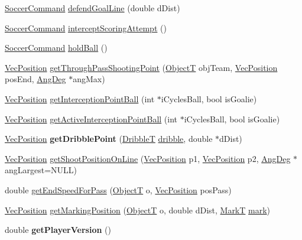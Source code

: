 \begin{DoxyCompactItemize}
\item 
\hyperlink{classSoccerCommand}{Soccer\+Command} \hyperlink{classBasicPlayer_ad6be860b141f47cb33eec9f0a3762dd8}{defend\+Goal\+Line} (double d\+Dist)
\item 
\hyperlink{classSoccerCommand}{Soccer\+Command} \hyperlink{classBasicPlayer_a20ea44e2d6f0105ae521c9ac9bf407ea}{intercept\+Scoring\+Attempt} ()
\item 
\hyperlink{classSoccerCommand}{Soccer\+Command} \hyperlink{classBasicPlayer_a6927be949526b68617b8663eae9e2b7d}{hold\+Ball} ()
\item 
\hyperlink{classVecPosition}{Vec\+Position} \hyperlink{classBasicPlayer_a803fc819ba92d02bf244d883f0f76203}{get\+Through\+Pass\+Shooting\+Point} (\hyperlink{SoccerTypes_8h_ad4b701fa66e7d26c054ed15b7820c77c}{ObjectT} obj\+Team, \hyperlink{classVecPosition}{Vec\+Position} pos\+End, \hyperlink{Geometry_8h_a6bfe02ae9bb185092902092561ab2865}{Ang\+Deg} $\ast$ang\+Max)
\item 
\hyperlink{classVecPosition}{Vec\+Position} \hyperlink{classBasicPlayer_af6cd1d09c374231ae78e10d0636a644d}{get\+Interception\+Point\+Ball} (int $\ast$i\+Cycles\+Ball, bool is\+Goalie)
\item 
\hyperlink{classVecPosition}{Vec\+Position} \hyperlink{classBasicPlayer_a1b50d5fb9c7fa0e5a90a7e4a215bafc0}{get\+Active\+Interception\+Point\+Ball} (int $\ast$i\+Cycles\+Ball, bool is\+Goalie)
\item 
\hyperlink{classVecPosition}{Vec\+Position} {\bfseries get\+Dribble\+Point} (\hyperlink{SoccerTypes_8h_a0ccbf575eb8292e31644ccf3e84e3e3b}{DribbleT} \hyperlink{classBasicPlayer_a63e33779fbadff1b61a499c4176ac6f4}{dribble}, double $\ast$d\+Dist)\hypertarget{classBasicPlayer_a9c4e9c5d0045117bc4ecfc75fc5b690c}{}\label{classBasicPlayer_a9c4e9c5d0045117bc4ecfc75fc5b690c}

\item 
\hyperlink{classVecPosition}{Vec\+Position} \hyperlink{classBasicPlayer_abf2b1236c259554ebdf96914ed2adb4f}{get\+Shoot\+Position\+On\+Line} (\hyperlink{classVecPosition}{Vec\+Position} p1, \hyperlink{classVecPosition}{Vec\+Position} p2, \hyperlink{Geometry_8h_a6bfe02ae9bb185092902092561ab2865}{Ang\+Deg} $\ast$ang\+Largest=N\+U\+LL)
\item 
double \hyperlink{classBasicPlayer_a95d6ecdb0d5f39f2644dc85e0da8cf3e}{get\+End\+Speed\+For\+Pass} (\hyperlink{SoccerTypes_8h_ad4b701fa66e7d26c054ed15b7820c77c}{ObjectT} o, \hyperlink{classVecPosition}{Vec\+Position} pos\+Pass)
\item 
\hyperlink{classVecPosition}{Vec\+Position} \hyperlink{classBasicPlayer_a914a86746493fefae4af754011b4150e}{get\+Marking\+Position} (\hyperlink{SoccerTypes_8h_ad4b701fa66e7d26c054ed15b7820c77c}{ObjectT} o, double d\+Dist, \hyperlink{SoccerTypes_8h_a4cc7adc5fa3df60a8143bd51fc421f92}{MarkT} \hyperlink{classBasicPlayer_ac5217a00d71206eaf17bf3656bd6f995}{mark})
\item 
double {\bfseries get\+Player\+Version} ()\hypertarget{classBasicPlayer_a05baabe77a35927934f2955deed50480}{}\label{classBasicPlayer_a05baabe77a35927934f2955deed50480}


\end{DoxyCompactItemize}
